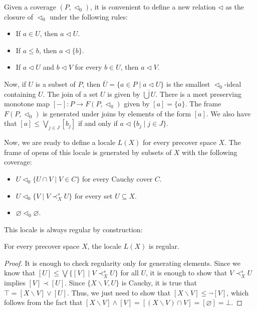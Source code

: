 \documentclass[reqno]{amsart}
\theoremstyle{definition}
\theoremstyle{remark}
\numberwithin{figure}{section}
\newcommand{\rb}{\prec}
\begin{document}
Given a coverage $(P,\triangleleft_0)$, it is convenient to define a new relation $\triangleleft$ as the closure of $\triangleleft_0$ under the following rules:
\begin{itemize}
\item If $a \in U$, then $a \triangleleft U$.
\item If $a \leq b$, then $a \triangleleft \{ b \}$.
\item If $a \triangleleft U$ and $b \triangleleft V$ for every $b \in U$, then $a \triangleleft V$.
\end{itemize}
Now, if $U$ is a subset of $P$, then $\overline{U} = \{ a \in P \mid a \triangleleft U \}$ is the smallest $\triangleleft_0$-ideal containing $U$.
The join of a set $U$ is given by $\overline{\bigcup U}$.
There is a meet preserving monotone map $[-] : P \to F(P,\triangleleft_0)$ given by $[a] = \overline{ \{ a \} }$.
The frame $F(P,\triangleleft_0)$ is generated under joins by elements of the form $[a]$.
We also have that $[a] \leq \bigvee_{j \in J} [b_j]$ if and only if $a \triangleleft \{ b_j \mid j \in J \}$.

Now, we are ready to define a locale $L(X)$ for every precover space $X$.
The frame of opens of this locale is generated by subsets of $X$ with the following coverage:
\begin{itemize}
\item $U \triangleleft_0 \{ U \cap V \mid V \in C \}$ for every Cauchy cover $C$.
\item $U \triangleleft_0 \{ V \mid V \rb^s_X U \}$ for every set $U \subseteq X$.
\item $\varnothing \triangleleft_0 \varnothing$.
\end{itemize}

This locale is always regular by construction:
\begin{lem}
For every precover space $X$, the locale $L(X)$ is regular.
\end{lem}
\begin{proof}
It is enough to check regularity only for generating elements.
Since we know that $[U] \leq \bigvee \{ [V] \mid V \rb^s_X U \}$ for all $U$, it is enough to show that $V \rb^s_X U$ implies $[V] \rb [U]$.
Since $\{ X \backslash V, U \}$ is Cauchy, it is true that $\top = [X \backslash V] \vee [U]$.
Thus, we just need to show that $[X \backslash V] \leq \neg [V]$, which follows from the fact that $[X \backslash V] \wedge [V] = [(X \backslash V) \cap V] = [\varnothing] = \bot$.
\end{proof}
\end{document}
